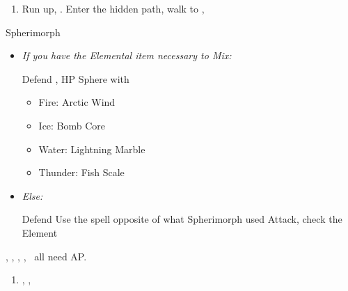 \begin{enumerate}[resume]
    \item Run up, \sd. Enter the hidden path, walk to \auron, \sd
\end{enumerate}
\begin{battle}[12000]{Spherimorph}
    \begin{itemize}
        \tidusf Defend
        \switch{\tidus}{\yuna}
        \yunaf Defend
        \kimahrif Defend
        \switch{\auron}{\rikku}
        \rikkuf Grenade, check the Element
        \item \textit{If you have the Elemental item necessary to Mix:}
        \begin{itemize}
            \switch{\yuna}{\lulu}
            \luluf Defend
            \rikkuf \od, HP Sphere with
            \begin{itemize}
                \item Fire: Arctic Wind
                \item Ice: Bomb Core
                \item Water: Lightning Marble
                \item Thunder: Fish Scale
            \end{itemize}
        \end{itemize}
        \item \textit{Else:}
        \begin{itemize}
            \yunaf Defend
            \switch{\rikku}{\lulu}
            \luluf Use the spell opposite of what Spherimorph used
            \kimahrif Attack, check the Element
            \switch{\yuna}{\rikku}
            \rikkuf \od
        \end{itemize}
    \end{itemize}
    \tidus, \yuna, \kimahri, \lulu, \rikku\ all need AP.
\end{battle}
\begin{enumerate}[resume]
    \item \cs[1:50], \sd, \sd
\end{enumerate}

